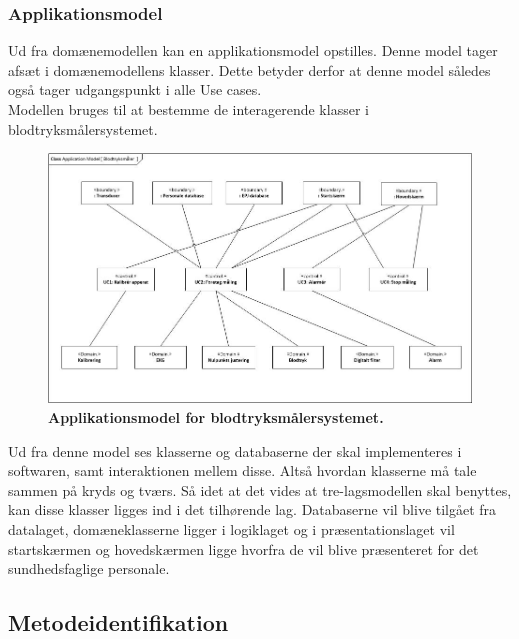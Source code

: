 \subsubsection{Applikationsmodel}
Ud fra domænemodellen kan en applikationsmodel opstilles. Denne model tager afsæt i domænemodellens klasser. Dette betyder derfor at denne model således også tager udgangspunkt i alle Use cases.\\
Modellen bruges til at bestemme de interagerende klasser i blodtryksmålersystemet.\\
\begin{figure}[H]
\includegraphics[width =1.0\textwidth , center]{billeder/appModel}
\caption{\textbf{Applikationsmodel for blodtryksmålersystemet.}}
\end{figure}
Ud fra denne model ses klasserne og databaserne der skal implementeres i softwaren, samt interaktionen mellem disse. Altså hvordan klasserne må tale sammen på kryds og tværs. Så idet at det vides at tre-lagsmodellen skal benyttes, kan disse klasser ligges ind i det tilhørende lag. Databaserne vil blive tilgået fra datalaget, domæneklasserne ligger i logiklaget og i præsentationslaget vil startskærmen og hovedskærmen ligge hvorfra de vil blive præsenteret for det sundhedsfaglige personale.
\subsection{Metodeidentifikation}
